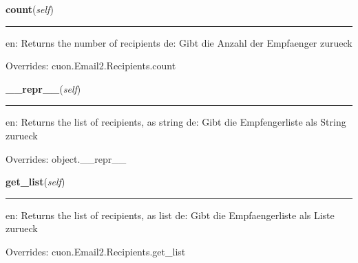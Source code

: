     \vspace{0.5ex}

\hspace{.8\funcindent}\begin{boxedminipage}{\funcwidth}

    \raggedright \textbf{count}(\textit{self})

    \vspace{-1.5ex}

    \rule{\textwidth}{0.5\fboxrule}
\setlength{\parskip}{2ex}
    en: Returns the number of recipients de: Gibt die Anzahl der Empfaenger
    zurueck

\setlength{\parskip}{1ex}
      Overrides: cuon.Email2.Recipients.count

    \end{boxedminipage}

    \vspace{0.5ex}

\hspace{.8\funcindent}\begin{boxedminipage}{\funcwidth}

    \raggedright \textbf{\_\_repr\_\_}(\textit{self})

    \vspace{-1.5ex}

    \rule{\textwidth}{0.5\fboxrule}
\setlength{\parskip}{2ex}
    en: Returns the list of recipients, as string de: Gibt die 
    Empfengerliste als String zurueck

\setlength{\parskip}{1ex}
      Overrides: object.\_\_repr\_\_

    \end{boxedminipage}

    \vspace{0.5ex}

\hspace{.8\funcindent}\begin{boxedminipage}{\funcwidth}

    \raggedright \textbf{get\_list}(\textit{self})

    \vspace{-1.5ex}

    \rule{\textwidth}{0.5\fboxrule}
\setlength{\parskip}{2ex}
    en: Returns the list of recipients, as list de: Gibt die 
    Empfaengerliste als Liste zurueck

\setlength{\parskip}{1ex}
      Overrides: cuon.Email2.Recipients.get\_list

    \end{boxedminipage}


